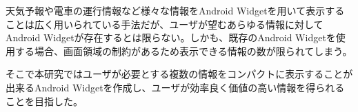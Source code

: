 
\begin{jabstract}
天気予報や電車の運行情報など様々な情報をAndroid Widgetを用いて表示することは広く用いられている手法だが、ユーザが望むあらゆる情報に対してAndroid Widgetが存在するとは限らない。しかも、既存のAndroid Widgetを使用する場合、画面領域の制約があるため表示できる情報の数が限られてしまう。

そこで本研究ではユーザが必要とする複数の情報をコンパクトに表示することが出来るAndroid Widgetを作成し、ユーザが効率良く価値の高い情報を得られることを目指した。

\end{jabstract}
